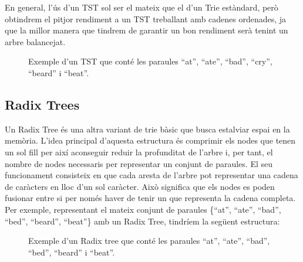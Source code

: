 En general, l'ús d'un TST sol ser el mateix que el d'un Trie estàndard, però obtindrem el pitjor rendiment a un TST treballant amb cadenes ordenades, ja que la millor manera que tindrem de garantir un bon rendiment serà tenint un arbre balancejat. 

\begin{figure}[h]
\centering
{}
\caption{Exemple d'un TST que conté les paraules ``at'', ``ate'', ``bad'', ``cry'', ``beard'' i ``beat''.}
\label{fig:tst}
\end{figure}


\subsection{Radix Trees}
Un Radix Tree és una altra variant de trie bàsic que busca estalviar espai en la memòria. L'idea principal d'aquesta estructura és comprimir els nodes que tenen un sol fill per així aconseguir reduir la profunditat de l'arbre i, per tant, el nombre de nodes necessaris per representar un conjunt de paraules.
El seu funcionament consisteix en que cada aresta de l'arbre pot representar una cadena de caràcters en lloc d'un sol caràcter. Això significa que els nodes es poden fusionar entre si per només haver de tenir un que representa la cadena completa. Per exemple, representant el mateix conjunt de paraules \{``at'', ``ate'', ``bad'', ``bed'', ``beard'', ``beat''\} amb un Radix Tree, tindríem la següent estructura:


\begin{figure}[h]
\centering
{}
\caption{Exemple d'un Radix tree que conté les paraules ``at'', ``ate'', ``bad'', ``bed'', ``beard'' i ``beat''.}
\end{figure}

